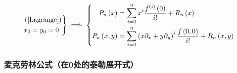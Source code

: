 \documentclass{article}
\begin{document}
\[\left.\begin{aligned}
         & \left(\ref{Lagrange}\right) \\
         & x_0=y_0=0
    \end{aligned}\right\}
    \implies
    \left\{\begin{aligned}
        P_n\left(x\right)   & =\sum_{i=0}^nx^i\frac{f^{\left(i\right)}\left(0\right)}{i!}+R_n\left(x\right)                       \\
        P_n\left(x,y\right) & =\sum_{i=0}^n\left(x\partial_x+y\partial_y\right)^i\frac{f\left(0,0\right)}{i!}+R_n\left(x,y\right)
    \end{aligned}\right.\]

\subsubsection{麦克劳林公式（在0处的泰勒展开式）\label{Maclaurin}}
\end{document}
